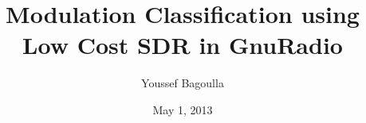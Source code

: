 \title{Modulation Classification using Low Cost SDR in GnuRadio}
\date{May 1, 2013}
\author{Youssef Bagoulla}